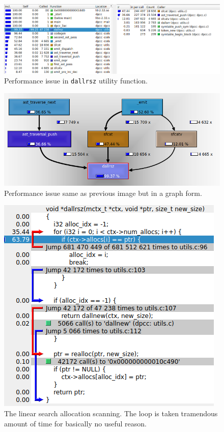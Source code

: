 \documentclass[a4paper]{article}
\begin{document}
\begin{figure}[H]
    \centering
    \includegraphics[width=\linewidth]{imgs/dallrsz_performance_issue.png}
    \caption{Performance issue in \texttt{dallrsz} utility function.}
\end{figure}


\begin{figure}[H]
    \centering
    \includegraphics[scale=0.85]{imgs/dallrsz_callgraph.png}
    \caption{Performance issue same as previous image but in a graph form.}
\end{figure}


\begin{figure}[H]
    \centering
    \includegraphics{imgs/dallrsz_code_usage.png}
    \caption{The linear search allocation scanning. The loop is taken tramendous amount of time for basically no useful reason.}
\end{figure}
\end{document}

